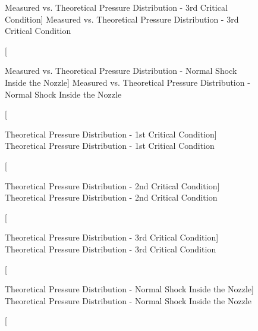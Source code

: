 \begin{figure}[htpb]
    \centering
     
     \caption
     [Measured vs. Theoretical Pressure Distribution - 3rd Critical Condition]
     {Measured vs. Theoretical Pressure Distribution - 3rd Critical Condition}
     \label{fig: MeasuredvsTheoreticalPressureDistribution3rdCriticalCondition}
\end{figure}

\begin{figure}[htpb]
    \centering
     
     \caption
     [Measured vs. Theoretical Pressure Distribution - Normal Shock Inside the Nozzle]
     {Measured vs. Theoretical Pressure Distribution - Normal Shock Inside the Nozzle}
     \label{fig: MeasuredvsTheoreticalPressureDistributionNormalShockInsidetheNozzle}
\end{figure}

\begin{figure}[htpb]
    \centering
     
     \caption
     [Theoretical Pressure Distribution - 1st Critical Condition]
     {Theoretical Pressure Distribution - 1st Critical Condition}
     \label{fig: TheoreticalPressureDistribution1stCriticalCondition}
\end{figure}

\begin{figure}[htpb]
    \centering
     
     \caption
     [Theoretical Pressure Distribution - 2nd Critical Condition]
     {Theoretical Pressure Distribution - 2nd Critical Condition}
     \label{fig: TheoreticalPressureDistribution2ndCriticalCondition}
\end{figure}

\begin{figure}[htpb]
    \centering
     
     \caption
     [Theoretical Pressure Distribution - 3rd Critical Condition]
     {Theoretical Pressure Distribution - 3rd Critical Condition}
     \label{fig: TheoreticalPressureDistribution3rdCriticalCondition}
\end{figure}

\begin{figure}[htpb]
    \centering
     
     \caption
     [Theoretical Pressure Distribution - Normal Shock Inside the Nozzle]
     {Theoretical Pressure Distribution - Normal Shock Inside the Nozzle}
     \label{fig: TheoreticalPressureDistributionNormalShockInsidetheNozzle}
\end{figure}

